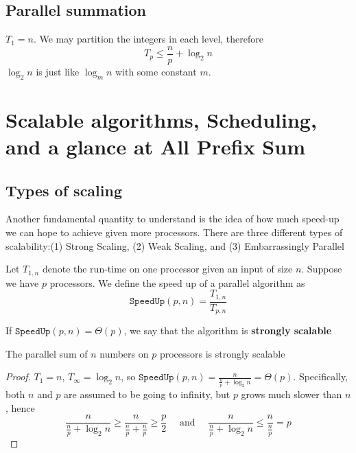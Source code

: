 \documentclass[11pt]{article}
\begin{document}
\subsection{Parallel summation}
\label{sec:orgca4e6e4}
\(T_1=n\). We may partition the integers in each level, therefore
\begin{equation*}
T_p\le\frac{n}{p}+\log_2n
\end{equation*}
\(\log_2n\) is just like \(\log_mn\) with some constant \(m\).
\section{Scalable algorithms, Scheduling, and a glance at All Prefix Sum}
\label{sec:orgaa1c719}
\subsection{Types of scaling}
\label{sec:orgb6a9753}
Another fundamental quantity to understand is the idea of how much speed-up we can hope to
achieve given more processors. There are three different types of scalability:(1) Strong
Scaling, (2) Weak Scaling, and (3) Embarrassingly Parallel

Let \(T_{1,n}\) denote the run-time on one processor given an input of size \(n\). Suppose we
have \(p\) processors. We define the speed up of a parallel algorithm as
\begin{equation*}
\texttt{SpeedUp}(p,n)=\frac{T_{1,n}}{T_{p,n}}
\end{equation*}

\begin{definition}
If \(\texttt{SpeedUp}(p,n)=\Theta(p)\), we say that the algorithm is \textbf{strongly scalable}
\end{definition}

\begin{proposition}[]
The parallel sum of \(n\) numbers on \(p\) processors is strongly scalable
\end{proposition}

\begin{proof}
\(T_1=n\), \(T_\infty=\log_2n\), so \(\texttt{SpeedUp}(p,n)=\frac{n}{\frac{n}{p}+\log_2n}=\Theta(p)\).
Specifically, both \(n\) and \(p\) are assumed to be going to infinity, but \(p\) grows much
slower than \(n\), hence
\begin{equation*}
\frac{n}{\frac{n}{p}+\log_2n}\ge\frac{n}{\frac{n}{p}+\frac{n}{p}}\ge\frac{p}{2}
\quad\text{ and }\quad
\frac{n}{\frac{n}{p}+\log_2n}\le\frac{n}{\frac{n}{p}}=p
\end{equation*}
\end{proof}
\end{document}
